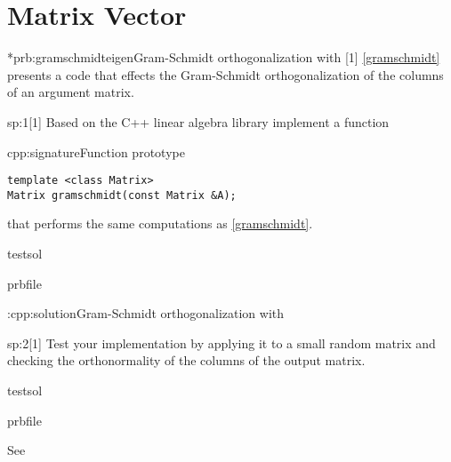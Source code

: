 \chapter{Matrix Vector}


\begin{samproblem}*{prb:gramschmidteigen}{Gram-Schmidt orthogonalization with \eigen{}}[1]{
\cref{gramschmidt} presents a \matlab{} code that effects the Gram-Schmidt
  orthogonalization of the columns of an argument matrix. 
}

\begin{subproblem}{sp:1}[1]
  Based on the C++ linear algebra library \eigen{} implement a function

	\begin{samcode}[C++-code]{cpp:signature}{Function prototype}
		\begin{lstlisting}[style=cpp]
template <class Matrix>  
Matrix gramschmidt(const Matrix &A);
		\end{lstlisting}
	\end{samcode}
	that performs the same computations as \cref{gramschmidt}. 


  \begin{samwriteprbpart}{testsol}
    \begin{writeverbatim}{prbfile}
      \begin{samsolution}
				\begin{samcode}[C++-code]{\cpl:cpp:solution}{Gram-Schmidt orthogonalization with \eigen{}}
					
				\end{samcode}
      \end{samsolution}
    \end{writeverbatim}
  \end{samwriteprbpart}

\end{subproblem}

\begin{subproblem}{sp:2}[1]
	\label{sp:strassen:2}
	Test your implementation by applying it to a small random matrix
	and checking the orthonormality of the columns of the output
	matrix.

  \begin{samwriteprbpart}{testsol}
    \begin{writeverbatim}{prbfile}
      \begin{samsolution}
				See 
      \end{samsolution}
    \end{writeverbatim}
  \end{samwriteprbpart}

\end{subproblem}

\end{samproblem}


